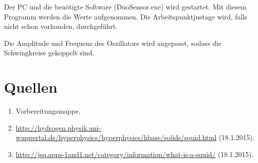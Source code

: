 \documentclass[a4paper,ngerman]{scrartcl}
\begin{document}
Der PC und die benötigte Software (DuoSensor.exe) wird gestartet.
Mit diesem Programm werden die Werte aufgenommen.
Die Arbeitspunktjustage wird, falls nicht schon vorhanden, durchgeführt.

Die Amplitude und Frequenz des Oszillators wird angepasst, sodass die Schwingkreise gekoppelt sind.





\section{Quellen}
\begin{enumerate}
\item Vorbereitungsmappe.\label{ref:mappe}
\item \url{http://hydrogen.physik.uni-wuppertal.de/hyperphysics/hyperphysics/hbase/solids/squid.html} (18.1.2015).\label{ref:wuppertal}
\item \url{http://jsq.apps-1and1.net/category/information/what-is-a-squid/} (18.1.2015).
\label{ref:jsq}
\end{enumerate}
\end{document}
